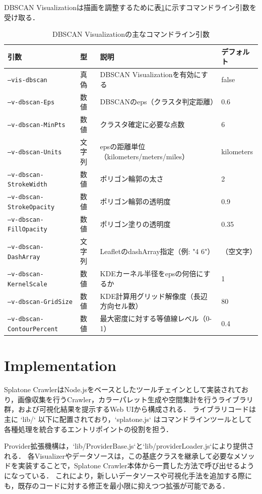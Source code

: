 DBSCAN Visualizationは描画を調整するために表\ref{tab:dbscan_params}に示すコマンドライン引数を受け取る．

\begin{table}[h]
\centering\small
\caption{DBSCAN Visualizationの主なコマンドライン引数}
\label{tab:dbscan_params}
\begin{tabular}{llll}
\hline
引数 & 型 & 説明 & デフォルト \\
\hline
  \texttt{--vis-dbscan} & 真偽 & DBSCAN Visualizationを有効にする & false \\
  \texttt{--v-dbscan-Eps} & 数値 & DBSCANのeps（クラスタ判定距離） & 0.6 \\
  \texttt{--v-dbscan-MinPts} & 数値 & クラスタ確定に必要な点数 & 6 \\
  \texttt{--v-dbscan-Units} & 文字列 & epsの距離単位（kilometers/meters/miles） & kilometers \\
  \texttt{--v-dbscan-StrokeWidth} & 数値 & ポリゴン輪郭の太さ & 2 \\
  \texttt{--v-dbscan-StrokeOpacity} & 数値 & ポリゴン輪郭の透明度 & 0.9 \\
  \texttt{--v-dbscan-FillOpacity} & 数値 & ポリゴン塗りの透明度 & 0.35 \\
  \texttt{--v-dbscan-DashArray} & 文字列 & LeafletのdashArray指定（例: "4 6"） & （空文字） \\
  \texttt{--v-dbscan-KernelScale} & 数値 & KDEカーネル半径をepsの何倍にするか & 1 \\
  \texttt{--v-dbscan-GridSize} & 数値 & KDE計算用グリッド解像度（長辺方向セル数） & 80 \\
  \texttt{--v-dbscan-ContourPercent} & 数値 & 最大密度に対する等値線レベル（0-1） & 0.4 \\
\hline
\end{tabular}
\end{table}


\section{Implementation}
\label{sec:implementation}
Splatone CrawlerはNode.jsをベースとしたツールチェインとして実装されており，画像収集を行うCrawler，カラーパレット生成や空間集計を行うライブラリ群，および可視化結果を提示するWeb UIから構成される．
ライブラリコードは主に `lib/` 以下に配置されており，`splatone.js` はコマンドラインツールとして各種処理を統合するエントリポイントの役割を担う．

Provider拡張機構は，`lib/ProviderBase.js`と`lib/providerLoader.js`により提供される．
各Visualizerやデータソースは，この基底クラスを継承して必要なメソッドを実装することで，Splatone Crawler本体から一貫した方法で呼び出せるようになっている．
これにより，新しいデータソースや可視化手法を追加する際にも，既存のコードに対する修正を最小限に抑えつつ拡張が可能である．


